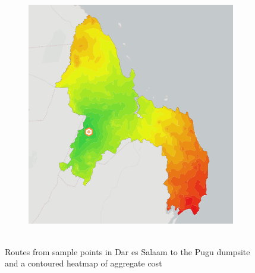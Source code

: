 \documentclass[a4paper,12pt,twoside]{article}
\begin{document}
\begin{figure}[h]
\begin{subfigure}[b]{0.37\textwidth}
    \includegraphics[width=\textwidth]{images/pgRouting_thematic.png}
    \label{fig:2}
  \end{subfigure}
\end{figure}
 \begin{figure}[h]
	\caption{Routes from sample points in Dar es Salaam to the Pugu dumpsite and a contoured heatmap of aggregate cost}
	\centering
	\includegraphics[width=0\textwidth]{images/Building_Footprint_Digitization.png}
\end{figure}

\end{document}
